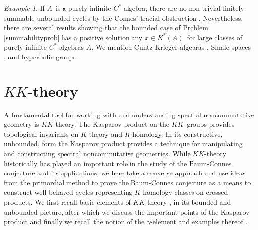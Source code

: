 \documentclass[a4paper,reqno]{amsart}
\numberwithin{equation}{section}
\theoremstyle{definition}
\theoremstyle{remark}
\newtheorem{example}[thm]{Example}
\begin{document}
\begin{example}
If $A$ is a purely infinite $C^*$-algebra, there are no non-trivial finitely summable unbounded cycles by the Connes' tracial obstruction \cite{ConnesETDS,GRU}. Nevertheless, there are several results showing that the bounded case of Problem \ref{summabilityprob} has a positive solution any $x\in K^*(A)$ for large classes of purely infinite $C^*$-algebras $A$. We mention Cuntz-Krieger algebras \cite{GM15}, Smale spaces \cite{Ger}, and hyperbolic groups \cite{EN}. 
\end{example}














\section{$KK$-theory}
\label{seckksda}



A fundamental tool for working with and understanding spectral noncommutative geometry is $KK$-theory. The Kasparov product on the $KK$–groups provides topological invariants on $K$-theory and $K$-homology. In its constructive, unbounded, form the Kasparov product provides a technique for manipulating and constructing spectral noncommutative geometries. While $KK$-theory historically has played an important role in the study of the Baum-Connes conjecture and its applications, we here take a converse approach and use ideas from the primordial method to prove the Baum-Connes conjecture as a means to construct well behaved cycles representing $K$-homology classes on crossed products. We first recall basic elements of $KK$-theory \cite{Blackadar,kaspinv,knudsenjensen,thebeastofmesland}, in its bounded and unbounded picture, after which we discuss the important points of the Kasparov product and finally we recall the notion of the $\gamma$-element and examples thereof \cite{kaspinv,tu00}. 
\end{document}
